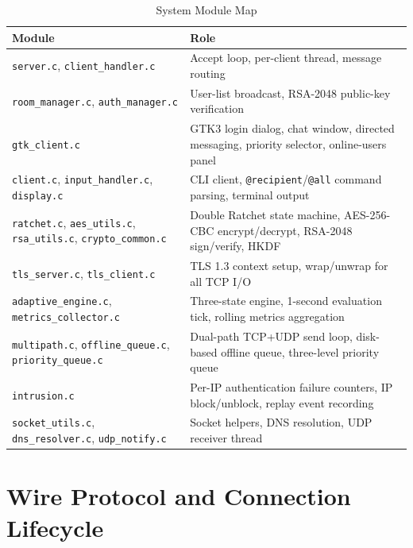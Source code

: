 \documentclass[conference]{IEEEtran}
\begin{document}
\begin{table}[t]
\caption{System Module Map}
\label{tab:modules}
\begin{center}
\begin{tabular}{|p{4.2cm}|p{9.8cm}|}
\hline
\textbf{Module} & \textbf{Role} \\
\hline
\texttt{server.c}, \texttt{client\_handler.c} & Accept loop, per-client thread, message routing \\
\hline
\texttt{room\_manager.c}, \texttt{auth\_manager.c} & User-list broadcast, RSA-2048 public-key verification \\
\hline
\texttt{gtk\_client.c} & GTK3 login dialog, chat window, directed messaging, priority selector, online-users panel \\
\hline
\texttt{client.c}, \texttt{input\_handler.c}, \texttt{display.c} & CLI client, \texttt{@recipient}/\texttt{@all} command parsing, terminal output \\
\hline
\texttt{ratchet.c}, \texttt{aes\_utils.c}, \texttt{rsa\_utils.c}, \texttt{crypto\_common.c} & Double Ratchet state machine, AES-256-CBC encrypt/decrypt, RSA-2048 sign/verify, HKDF \\
\hline
\texttt{tls\_server.c}, \texttt{tls\_client.c} & TLS 1.3 context setup, wrap/unwrap for all TCP I/O \\
\hline
\texttt{adaptive\_engine.c}, \texttt{metrics\_collector.c} & Three-state engine, 1-second evaluation tick, rolling metrics aggregation \\
\hline
\texttt{multipath.c}, \texttt{offline\_queue.c}, \texttt{priority\_queue.c} & Dual-path TCP+UDP send loop, disk-based offline queue, three-level priority queue \\
\hline
\texttt{intrusion.c} & Per-IP authentication failure counters, IP block/unblock, replay event recording \\
\hline
\texttt{socket\_utils.c}, \texttt{dns\_resolver.c}, \texttt{udp\_notify.c} & Socket helpers, DNS resolution, UDP receiver thread \\
\hline
\end{tabular}
\end{center}
\end{table}

\section{Wire Protocol and Connection Lifecycle}
\end{document}
